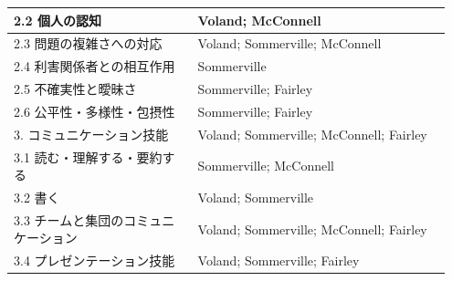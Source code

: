 \begin{center}
\begin{longtable}{p{0.40\linewidth}p{0.55\linewidth}}
\midrule
2.2 個人の認知 & Voland; McConnell \\
\midrule
2.3 問題の複雑さへの対応 & Voland; Sommerville; McConnell \\
\midrule
2.4 利害関係者との相互作用 & Sommerville \\
\midrule
2.5 不確実性と曖昧さ & Sommerville; Fairley \\
\midrule
2.6 公平性・多様性・包摂性 & Sommerville; Fairley \\
\midrule
3. コミュニケーション技能 & Voland; Sommerville; McConnell; Fairley \\
\midrule
3.1 読む・理解する・要約する & Sommerville; McConnell \\
\midrule
3.2 書く & Voland; Sommerville \\
\midrule
3.3 チームと集団のコミュニケーション & Voland; Sommerville; McConnell; Fairley \\
\midrule
3.4 プレゼンテーション技能 & Voland; Sommerville; Fairley \\
\midrule
\bottomrule
\end{longtable}
\normalsize
\end{center}
